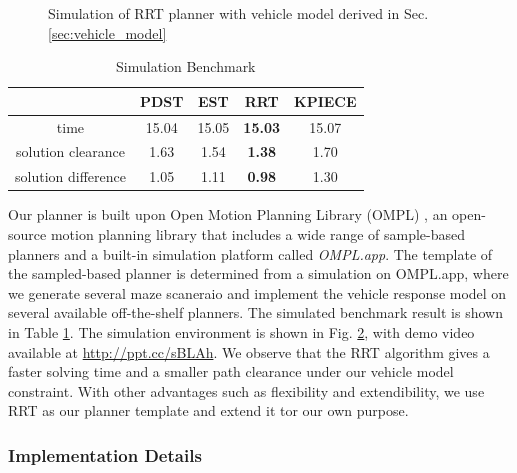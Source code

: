 \documentclass[../thesis.tex]{subfiles}
\begin{document}
\begin{figure}[t]
\begin{subfigure}[b]{0.3\linewidth}
		\subcaption{}
		\label{fig:rrt-sim-maze2}
	\end{subfigure}
	\caption{Simulation of RRT planner with vehicle model derived in Sec. \ref{sec:vehicle_model}}
    \label{fig:rrt-sim-maze}
\end{figure}


\begin{table}[t]
	\centering
	\caption{Simulation Benchmark}
	\label{table:simulation-benchmark}
	\begin{small}
	\begin{sc}
	\begin{tabular}{ccccc}
		\toprule 
			& PDST \cite{ladd2005motion} & EST \cite{hsu1997path} & RRT \cite{kuffner2000rrt} & KPIECE \cite{csucan2009kinodynamic} \\
		\midrule \midrule
		time & 15.04 & 15.05 & \textbf{15.03} & 15.07 \\
		solution clearance & 1.63 & 1.54 & \textbf{1.38} & 1.70 \\
		solution difference & 1.05 & 1.11 & \textbf{0.98} & 1.30 \\
		\toprule
	\end{tabular}
	\end{sc}
	\end{small}
\end{table}

Our planner is built upon Open Motion Planning Library (OMPL) \cite{sucan2012the-open-motion-planning-library}, an open-source motion planning library that includes a wide range of sample-based planners and a built-in simulation platform called \textit{OMPL.app}. 
The template of the sampled-based planner is determined from a simulation on OMPL.app, where we generate several maze scaneraio and implement the vehicle response model on several available off-the-shelf planners. The simulated benchmark result is shown in Table \ref{table:simulation-benchmark}. The simulation environment is shown in Fig. \ref{fig:rrt-sim-maze}, with demo video available at \url{http://ppt.cc/sBLAh}. We observe that the RRT algorithm gives a faster solving time and a smaller path clearance under our vehicle model constraint. With other advantages such as flexibility and extendibility, we use RRT as our planner template and extend it tor our own purpose.


\subsubsection{Implementation Details}
\end{document}
